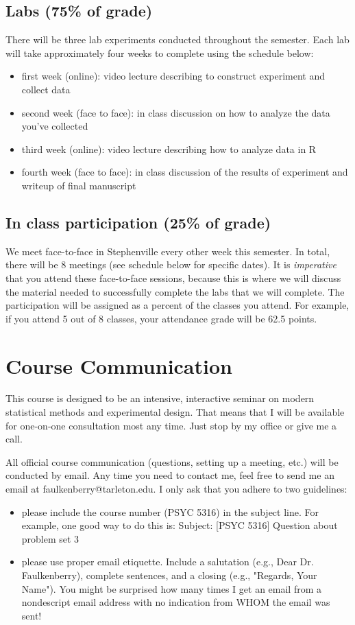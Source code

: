 \documentclass[10pt]{article}
\begin{document}
\subsection*{Labs (75\% of grade)}
\label{sec:org21c1e0f}
There will be three lab experiments conducted throughout the semester.  Each lab will take approximately four weeks to complete using the schedule below:

\begin{itemize}
\item first week (online): video lecture describing to construct experiment and collect data
\item second week (face to face): in class discussion on how to analyze the data you've collected
\item third week (online): video lecture describing how to analyze data in R
\item fourth week (face to face): in class discussion of the results of experiment and writeup of final manuscript
\end{itemize}

\subsection*{In class participation (25\% of grade)}
\label{sec:orgf3214b6}

We meet face-to-face in Stephenville every other week this semester.  In total, there will be 8 meetings (see schedule below for specific dates).  It is \emph{imperative} that you attend these face-to-face sessions, because this is where we will discuss the material needed to successfully complete the labs that we will complete.  The participation will be assigned as a percent of the classes you attend. For example, if you attend 5 out of 8 classes, your attendance grade will be 62.5 points.

\section*{Course Communication}
\label{sec:org0126041}

This course is designed to be an intensive, interactive seminar on modern statistical methods and experimental design.  That means that I will be available for one-on-one consultation most any time.  Just stop by my office or give me a call.

All official course communication (questions, setting up a meeting, etc.) will be conducted by email.  Any time you need to contact me, feel free to send me an email at faulkenberry@tarleton.edu.  I only ask that you adhere to two guidelines:
\begin{itemize}
\item please include the course number (PSYC 5316) in the subject line.  For example, one good way to do this is:  Subject: [PSYC 5316] Question about problem set 3
\item please use proper email etiquette.  Include a salutation (e.g., Dear Dr. Faulkenberry), complete sentences, and a closing (e.g., "Regards, Your Name").  You might be surprised how many times I get an email from a nondescript email address with no indication from WHOM the email was sent!
\end{itemize}
\end{document}

